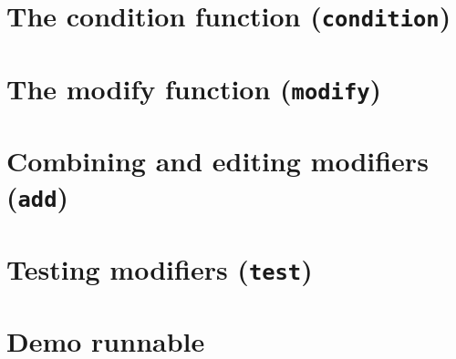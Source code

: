 \documentclass[]{book}
\begin{document}
\hypertarget{the-condition-function-condition}{%
\section{\texorpdfstring{The condition function (\texttt{condition})}{The condition function (condition)}}\label{the-condition-function-condition}}

\hypertarget{the-modify-function-modify}{%
\section{\texorpdfstring{The modify function (\texttt{modify})}{The modify function (modify)}}\label{the-modify-function-modify}}

\hypertarget{combining-and-editing-modifiers-add}{%
\section{\texorpdfstring{Combining and editing modifiers (\texttt{add})}{Combining and editing modifiers (add)}}\label{combining-and-editing-modifiers-add}}

\hypertarget{testing-modifiers-test}{%
\section{\texorpdfstring{Testing modifiers (\texttt{test})}{Testing modifiers (test)}}\label{testing-modifiers-test}}

\hypertarget{demo-runnable}{%
\section{Demo runnable}\label{demo-runnable}}
\end{document}
